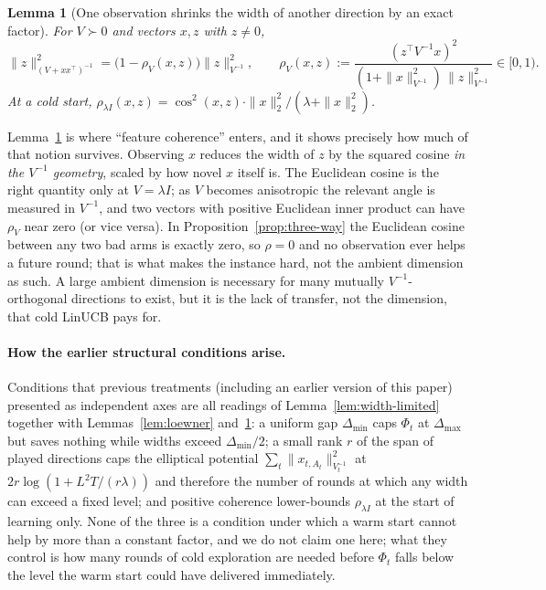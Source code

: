 \documentclass{article}
\newtheorem{lemma}{Lemma}
\theoremstyle{definition}
\theoremstyle{remark}
\theoremstyle{remark}
\begin{document}
\begin{lemma}[One observation shrinks the width of another direction by an
exact factor]
\label{lem:transfer}
For $V\succ0$ and vectors $x,z$ with $z\ne0$,
\[
\|z\|^2_{(V+xx^\top)^{-1}}=\bigl(1-\rho_V(x,z)\bigr)\|z\|^2_{V^{-1}},
\qquad
\rho_V(x,z):=\frac{(z^\top V^{-1}x)^2}{(1+\|x\|^2_{V^{-1}})\,\|z\|^2_{V^{-1}}}\in[0,1).
\]
At a cold start, $\rho_{\lambda I}(x,z)=\cos^2(x,z)\cdot\|x\|_2^2/(\lambda+\|x\|_2^2)$.
\end{lemma}

Lemma~\ref{lem:transfer} is where ``feature coherence'' enters, and it shows
precisely how much of that notion survives. Observing $x$ reduces the width of
$z$ by the squared cosine \emph{in the $V^{-1}$ geometry}, scaled by how novel
$x$ itself is. The Euclidean cosine is the right quantity only at $V=\lambda I$;
as $V$ becomes anisotropic the relevant angle is measured in $V^{-1}$, and two
vectors with positive Euclidean inner product can have $\rho_V$ near zero (or
vice versa). In Proposition~\ref{prop:three-way} the Euclidean cosine between
any two bad arms is exactly zero, so $\rho=0$ and no observation ever helps a
future round; that is what makes the instance hard, not the ambient dimension
as such. A large ambient dimension is necessary for many mutually
$V^{-1}$-orthogonal directions to exist, but it is the lack of transfer, not
the dimension, that cold LinUCB pays for.

\paragraph{How the earlier structural conditions arise.}
Conditions that previous treatments (including an earlier version of this
paper) presented as independent axes are all readings of
Lemma~\ref{lem:width-limited} together with Lemmas~\ref{lem:loewner}
and~\ref{lem:transfer}: a uniform gap $\Delta_{\min}$ caps $\Phi_t$ at
$\Delta_{\max}$ but saves nothing while widths exceed $\Delta_{\min}/2$; a small
rank $r$ of the span of played directions caps the elliptical potential
$\sum_t\|x_{t,A_t}\|^2_{V_t^{-1}}$ at $2r\log(1+L^2T/(r\lambda))$ and therefore
the number of rounds at which any width can exceed a fixed level; and positive
coherence lower-bounds $\rho_{\lambda I}$ at the start of learning only. None
of the three is a condition under which a warm start cannot help by more than
a constant factor, and we do not claim one here; what they control is how
many rounds of cold exploration are needed before $\Phi_t$ falls below the
level the warm start could have delivered immediately.
\end{document}
